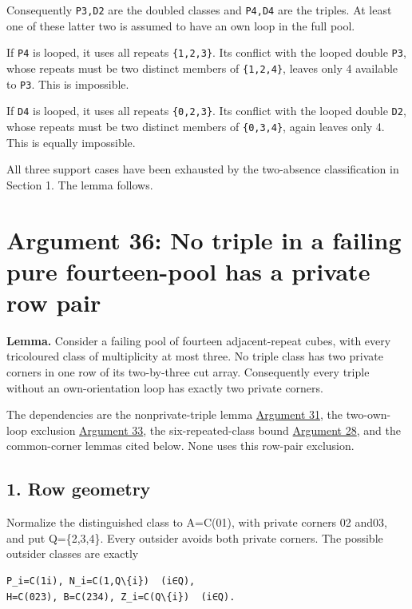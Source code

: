 \documentclass[
  10pt,
]{article}
\begin{document}
Consequently \texttt{P3,D2} are the doubled classes and \texttt{P4,D4}
are the triples. At least one of these latter two is assumed to have an
own loop in the full pool.

If \texttt{P4} is looped, it uses all repeats \texttt{\{1,2,3\}}. Its
conflict with the looped double \texttt{P3}, whose repeats must be two
distinct members of \texttt{\{1,2,4\}}, leaves only 4 available to
\texttt{P3}. This is impossible.

If \texttt{D4} is looped, it uses all repeats \texttt{\{0,2,3\}}. Its
conflict with the looped double \texttt{D2}, whose repeats must be two
distinct members of \texttt{\{0,3,4\}}, again leaves only 4. This is
equally impossible.

All three support cases have been exhausted by the two-absence
classification in Section 1. The lemma follows.

\hypertarget{arg-36}{%
\section{Argument 36: No triple in a failing pure fourteen-pool has a
private row pair}\label{arg-36}}

\textbf{Lemma.} Consider a failing pool of fourteen adjacent-repeat
cubes, with every tricoloured class of multiplicity at most three. No
triple class has two private corners in one row of its two-by-three cut
array. Consequently every triple without an own-orientation loop has
exactly two private corners.

The dependencies are the nonprivate-triple lemma
\protect\hyperlink{arg-31}{Argument 31}, the two-own-loop exclusion
\protect\hyperlink{arg-33}{Argument 33}, the six-repeated-class bound
\protect\hyperlink{arg-28}{Argument 28}, and the common-corner lemmas
cited below. None uses this row-pair exclusion.

\hypertarget{row-geometry}{%
\subsection*{1. Row geometry}\label{row-geometry}}

Normalize the distinguished class to A=C(01), with private corners 02
and03, and put Q=\{2,3,4\}. Every outsider avoids both private corners.
The possible outsider classes are exactly

\begin{verbatim}
P_i=C(1i), N_i=C(1,Q\{i})  (i∈Q),
H=C(023), B=C(234), Z_i=C(Q\{i})  (i∈Q).
\end{verbatim}
\end{document}
